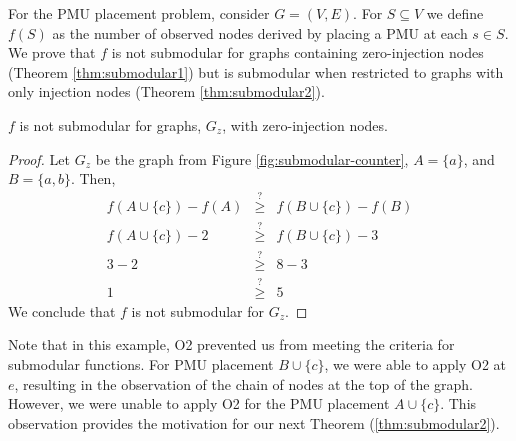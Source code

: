 For the PMU placement problem, consider $G=(V,E)$.  For $S \subseteq V$ we define $f(S)$ as the number of observed nodes derived by placing a PMU at each $s \in S$.  
We prove that $f$ is not submodular for graphs containing zero-injection nodes (Theorem \ref{thm:submodular1}) but is submodular when restricted
to graphs with only injection nodes (Theorem \ref{thm:submodular2}). 


\begin{theorem}
\label{thm:submodular1}
$f$ is not submodular for graphs, $G_z$, with zero-injection nodes.
\end{theorem}

\begin{proof}
Let $G_z$ be the graph from Figure \ref{fig:submodular-counter}, $A=\{a\}$, and $B=\{a,b\}$. Then, %
\begin{eqnarray*}
f(A \cup \{c\}) - f(A) &\stackrel{?}{\geq}& f(B \cup \{c\}) - f(B) \\
f(A \cup \{c\}) - 2 &\stackrel{?}{\geq}& f(B \cup \{c\}) - 3 \\
3-2 &\stackrel{?}{\geq}& 8 - 3 \\
1 &\stackrel{?}{\geq}& 5
\end{eqnarray*}
We conclude that $f$ is not submodular for $G_z$. %
\end{proof}

Note that in this example, O2 prevented us from meeting the criteria for submodular functions.  For PMU placement $B \cup \{c\}$, we were able to apply O2 at $e$, resulting in the observation of the
chain of nodes at the top of the graph.  However, we were unable to apply O2 for the PMU placement $A \cup \{c\}$.  This observation provides the motivation for our next Theorem (\ref{thm:submodular2}).
  

